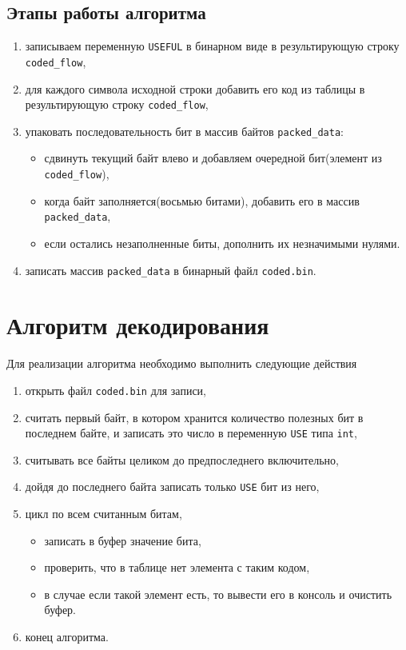 \subsection*{Этапы работы алгоритма}
\begin{enumerate}
	\item записываем переменную \texttt{USEFUL} в бинарном виде в результирующую строку \texttt{co\-ded\_flow},
	\item для каждого символа исходной строки добавить его код из таблицы в результирующую строку \texttt{co\-ded\_flow},
	\item упаковать последовательность бит в массив байтов \texttt{packed\_data}:
	\begin{itemize}
		\item сдвинуть текущий байт влево и добавляем очередной бит(элемент из \texttt{co\-ded\_flow}),
		\item когда байт заполняется(восьмью битами), добавить его в массив \texttt{packed\_data},
		\item если остались незаполненные биты, дополнить их незначимыми нулями.
	\end{itemize}
	\item записать массив \texttt{packed\_data} в бинарный файл \texttt{coded.bin}.
\end{enumerate}

\section{Алгоритм декодирования}
Для реализации алгоритма необходимо выполнить следующие действия
\begin{enumerate}
	\item открыть файл \texttt{coded.bin} для записи,
	\item считать первый байт, в котором хранится количество полезных бит в последнем байте, и записать это число в переменную \texttt{USE} типа \texttt{int},
	\item считывать все байты целиком до предпоследнего включительно,
	\item дойдя до последнего байта записать только \texttt{USE} бит из него,
	\item цикл по всем считанным битам,
	\begin{itemize}
		\item записать в буфер значение бита,
		\item проверить, что в таблице нет элемента с таким кодом,
		\item в случае если такой элемент есть, то вывести его в консоль и очистить буфер.
	\end{itemize}
	\item конец алгоритма.
\end{enumerate}
\clearpage
